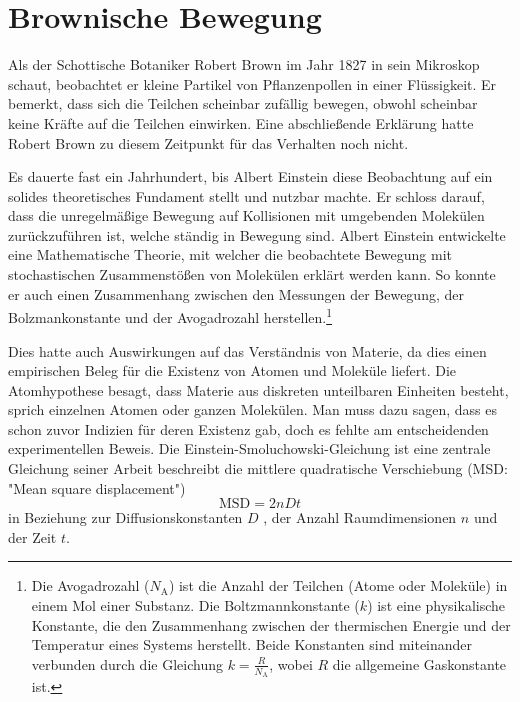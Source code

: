 %
%
%
%

\section{Brownische Bewegung\label{brown:BrownBewegung}}

Als der Schottische Botaniker Robert Brown im Jahr 1827 in sein Mikroskop schaut, beobachtet er kleine Partikel von Pflanzenpollen in einer Flüssigkeit. Er bemerkt, dass sich die Teilchen scheinbar zufällig bewegen, obwohl scheinbar keine Kräfte auf die Teilchen einwirken. Eine abschließende Erklärung hatte Robert Brown zu diesem Zeitpunkt für das Verhalten noch nicht.


Es dauerte fast ein Jahrhundert, bis Albert Einstein diese Beobachtung auf ein solides theoretisches Fundament stellt und nutzbar machte. Er schloss darauf, dass die unregelmäßige Bewegung auf Kollisionen mit umgebenden Molekülen zurückzuführen ist, welche ständig in Bewegung sind. Albert Einstein entwickelte eine Mathematische Theorie, mit welcher die beobachtete Bewegung mit stochastischen Zusammenstößen von Molekülen erklärt werden kann. So konnte er auch einen Zusammenhang zwischen den Messungen der Bewegung, der Bolzmankonstante und der  Avogadrozahl herstellen.\footnote{Die Avogadrozahl ($N_\mathrm{A}$) ist die Anzahl der Teilchen (Atome oder Moleküle) in einem Mol einer Substanz. Die Boltzmannkonstante ($k$) ist eine physikalische Konstante, die den Zusammenhang zwischen der thermischen Energie und der Temperatur eines Systems herstellt. Beide Konstanten sind miteinander verbunden durch die Gleichung $k = \frac{R}{N_\mathrm{A}}$, wobei $R$ die allgemeine Gaskonstante ist.}


Dies hatte auch Auswirkungen auf das Verständnis von Materie, da dies einen empirischen Beleg für die Existenz von Atomen und Moleküle liefert. Die Atomhypothese besagt, dass Materie aus diskreten unteilbaren Einheiten besteht, sprich einzelnen Atomen oder ganzen Molekülen. 
Man muss dazu sagen, dass es schon zuvor Indizien für deren Existenz gab, doch es fehlte am entscheidenden experimentellen Beweis.
Die Einstein-Smoluchowski-Gleichung ist eine zentrale Gleichung seiner Arbeit beschreibt die mittlere quadratische Verschiebung (MSD: "Mean square displacement")
\begin{equation}
	\mathrm{MSD} = 2nDt
\end{equation}
in Beziehung zur Diffusionskonstanten $ D $ , der Anzahl Raumdimensionen $ n $ und der Zeit $ t $.

